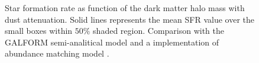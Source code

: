\begin{figure}
\caption{Star formation rate as function of the dark matter halo mass with dust attenuation. 
Solid lines represents the mean SFR value over the small boxes within $50\%$  shaded region.
Comparison with the GALFORM semi-analitical model \citep{gonzalez14} and a implementation
of abundance matching model \citep{behroozi13}. }
\label{graph_SFR_DMHM_w}
\end{figure}
